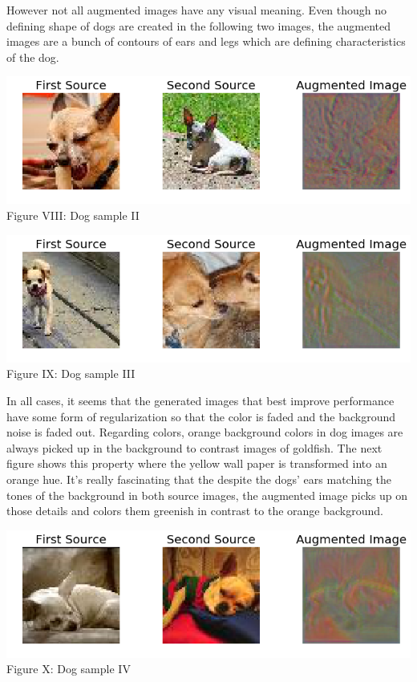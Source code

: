 \documentclass[10pt,twocolumn,letterpaper]{article}
\begin{document}
However not all augmented images have any visual meaning. Even though no defining shape of dogs are created in the following two images, the augmented images are a bunch of contours of ears and legs which are defining characteristics of the dog. 

\begin{center}
\includegraphics[scale=0.33]{dog2}
Figure VIII: Dog sample II
\end{center}

\begin{center}
\includegraphics[scale=0.33]{dog4}
Figure IX: Dog sample III
\end{center}


In all cases, it seems that the generated images that best improve performance have some form of regularization so that the color is faded and the background noise is faded out. Regarding colors, orange background colors in dog images are always picked up in the background to contrast images of goldfish. The next figure shows this property where the yellow wall paper is transformed into an orange hue. It's really fascinating that the despite the dogs' ears matching the tones of the background in both source images, the augmented image picks up on those details and colors them greenish in contrast to the orange background. 

\begin{center}
\includegraphics[scale=0.33]{dog3}
Figure X: Dog sample IV
\end{center}
\end{document}
